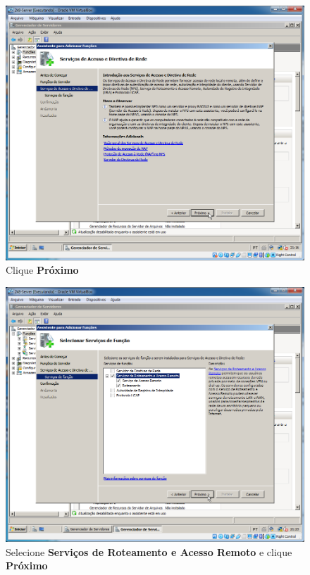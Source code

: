 \documentclass[10pt]{article}
\begin{document}
\begin{figure}[H]
    \centering
    \caption{Clique \textbf{Próximo}}
    \label{fig:re018}
    \includegraphics[width=\linewidth]{images/rede_externa/re018.png}
\end{figure}
\begin{figure}[H]
    \centering
    \caption{Selecione \textbf{Serviços de Roteamento e Acesso Remoto} e clique \textbf{Próximo}}
    \label{fig:re019}
    \includegraphics[width=\linewidth]{images/rede_externa/re019.png}
\end{figure}
\end{document}
